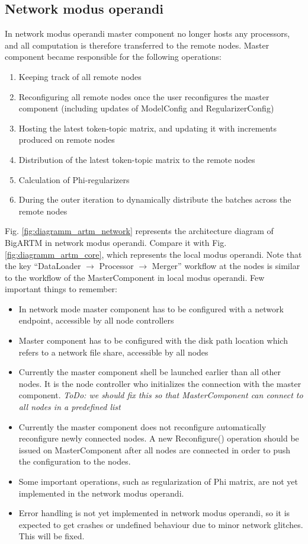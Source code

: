\documentclass[11pt,a4paper,twoside]{report}
\begin{document}
\subsection{Network modus operandi}
\label{label:network_modus_operandi}

In network modus operandi master component no longer hosts any processors,
and all computation is therefore transferred to the remote nodes.
Master component became responsible for the following operations:
\begin{enumerate}
\item Keeping track of all remote nodes
\item Reconfiguring all remote nodes once the user reconfigures the master component
      (including updates of ModelConfig and RegularizerConfig)
\item Hosting the latest token-topic matrix, and updating it with increments produced on remote nodes
\item Distribution of the latest token-topic matrix to the remote nodes
\item Calculation of Phi-regularizers
\item During the outer iteration to dynamically distribute the batches across the remote nodes
\end{enumerate}

Fig. \ref{fig:diagramm_artm_network} represents the architecture diagram of BigARTM in network modus operandi.
Compare it with Fig. \ref{fig:diagramm_artm_core}, which represents the local modus operandi.
Note that the key  ``DataLoader $\rightarrow$ Processor $\rightarrow$ Merger'' workflow
at the nodes is similar to the workflow of the MasterComponent in local modus operandi.
Few important things to remember:
\begin{itemize}
    \item In network mode master component has to be configured with a network endpoint,
          accessible by all node controllers
    \item Master component has to be configured with the disk path location which refers
          to a network file share, accessible by all nodes
    \item Currently the master component shell be launched earlier than all other nodes.
          It is the node controller who initializes the connection with the master component.
          \emph{ToDo: we should fix this so that MasterComponent can connect to all nodes in a predefined list}
    \item Currently the master component does not reconfigure automatically reconfigure newly connected nodes.
          A new Reconfigure() operation should be issued on MasterComponent
          after all nodes are connected in order to push the configuration to the nodes.
    \item Some important operations, such as regularization of Phi matrix,
          are not yet implemented in the network modus operandi.
    \item Error handling is not yet implemented in network modus operandi,
          so it is expected to get crashes or undefined behaviour due to minor network glitches.
          This will be fixed.
\end{itemize}
\end{document}
